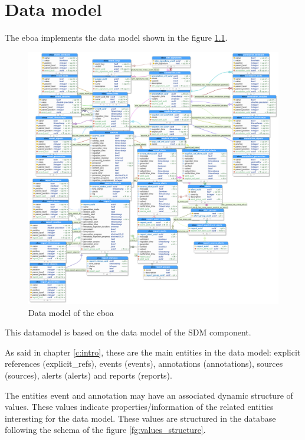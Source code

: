 \chapter{Data model}

The \acrshort{eboa} implements the data model shown in the figure \ref{fg:eboadb}.

\begin{figure}[H]
  \begin{center}
	\centering\includegraphics[width=150mm]{../fig/eboadb.png}
	\caption{Data model of the \acrshort{eboa}}
	\label{fg:eboadb}
  \end{center}
\end{figure}

This datamodel is based on the data model of the SDM component.

As said in chapter \ref{c:intro}, these are the main entities in the data model: explicit references (explicit\_refs), events (events), annotations (annotations), sources (sources), alerts (alerts) and reports (reports).

The entities event and annotation may have an associated dynamic structure of values. These values indicate properties/information of the related entities interesting for the data model. These values are structured in the database following the schema of the figure \ref{fg:values_structure}.

